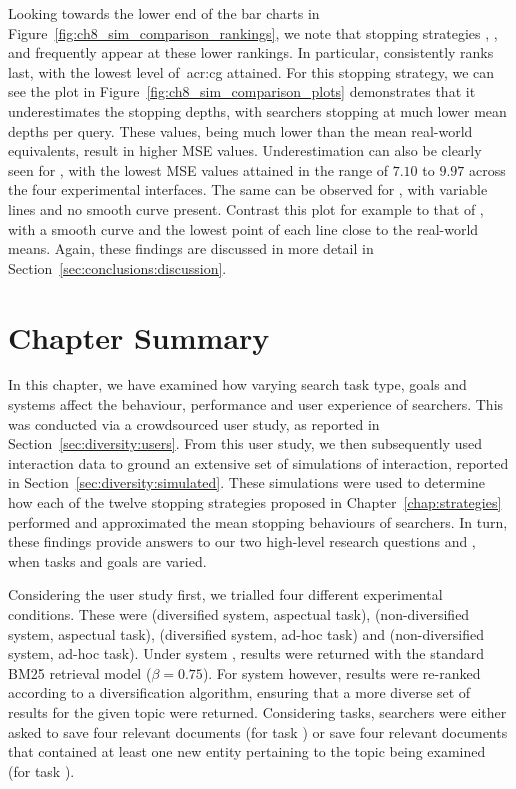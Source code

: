 Looking towards the lower end of the bar charts in Figure~\ref{fig:ch8_sim_comparison_rankings}, we note that stopping strategies , ,  and  frequently appear at these lower rankings. In particular,  consistently ranks last, with the lowest level of~\gls{acr:cg} attained. For this stopping strategy, we can see the plot in Figure~\ref{fig:ch8_sim_comparison_plots} demonstrates that it underestimates the stopping depths, with searchers stopping at much lower mean depths per query. These values, being much lower than the mean real-world equivalents, result in higher MSE values. Underestimation can also be clearly seen for , with the lowest MSE values attained in the range of $7.10$ to $9.97$ across the four experimental interfaces. The same can be observed for , with variable lines and no smooth curve present. Contrast this plot for example to that of , with a smooth curve and the lowest point of each line close to the real-world means. Again, these findings are discussed in more detail in Section~\ref{sec:conclusions:discussion}.

\section{Chapter Summary}
In this chapter, we have examined how varying search task type, goals and systems affect the behaviour, performance and user experience of searchers. This was conducted via a crowdsourced user study, as reported in Section~\ref{sec:diversity:users}. From this user study, we then subsequently used interaction data to ground an extensive set of simulations of interaction, reported in Section~\ref{sec:diversity:simulated}. These simulations were used to determine how each of the twelve stopping strategies proposed in Chapter~\ref{chap:strategies} performed and approximated the mean stopping behaviours of searchers. In turn, these findings provide answers to our two high-level research questions  and , when tasks and goals are varied.

Considering the user study first, we trialled four different experimental conditions. These were  (diversified system, aspectual task),  (non-diversified system, aspectual task),  (diversified system, ad-hoc task) and  (non-diversified system, ad-hoc task). Under system , results were returned with the standard BM25 retrieval model ($\beta=0.75$). For system  however, results were re-ranked according to a diversification algorithm, ensuring that a more diverse set of results for the given topic were returned. Considering tasks, searchers were either asked to save four relevant documents (for task ) or save four relevant documents that contained at least one new entity pertaining to the topic being examined (for task ).

